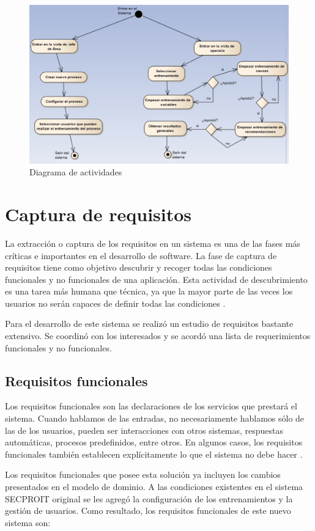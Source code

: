 \begin{figure}[h]
\centering
 \includegraphics[width=0.7\linewidth]{imagen/actividades.png}
 \caption{Diagrama de actividades}
 \label{fig:actividades} 
\end{figure} 


\section{Captura de requisitos}
La extracción o captura de los requisitos en un sistema es una de las fases más críticas e importantes en el desarrollo de software. La fase de captura de requisitos tiene como objetivo descubrir y recoger todas las condiciones funcionales y no funcionales de una aplicación. Esta actividad de descubrimiento es una tarea más humana que técnica, ya que la mayor parte de las veces los usuarios no serán capaces de definir todas las condiciones \cite{Dave2022}. 

Para el desarrollo de este sistema se realizó un estudio de requisitos bastante extensivo. Se coordinó con los interesados y se acordó una lista de requerimientos funcionales y no funcionales.

\subsection{Requisitos funcionales}
Los requisitos funcionales son las declaraciones de los servicios que prestará el sistema. Cuando hablamos de las entradas, no necesariamente hablamos sólo de las de los usuarios, pueden ser interacciones con otros sistemas, respuestas automáticas, procesos predefinidos, entre otros. En algunos casos, los requisitos funcionales también establecen explícitamente lo que el sistema no debe hacer \cite{Dave2022}.

Los requisitos funcionales que posee esta solución ya incluyen los cambios presentados en el modelo de dominio. A las condiciones existentes en el sistema SECPROIT original se les agregó la configuración de los entrenamientos y la gestión de usuarios. Como resultado, los requisitos funcionales de este nuevo sistema son:

